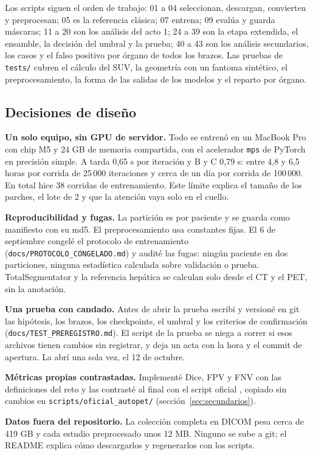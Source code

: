 Los scripts siguen el orden de trabajo: 01 a 04 seleccionan, descargan, convierten y preprocesan; 05 es la referencia clásica; 07 entrena; 09 evalúa y guarda máscaras; 11 a 20 son los análisis del acto 1; 24 a 39 son la etapa extendida, el ensamble, la decisión del umbral y la prueba; 40 a 43 son los análisis secundarios, los casos y el falso positivo por órgano de todos los brazos. Las pruebas de \texttt{tests/} cubren el cálculo del SUV, la geometría con un fantoma sintético, el preprocesamiento, la forma de las salidas de los modelos y el reparto por órgano.

\subsection{Decisiones de diseño}

\textbf{Un solo equipo, sin GPU de servidor.} Todo se entrenó en un MacBook Pro con chip M5 y 24 GB de memoria compartida, con el acelerador \texttt{mps} de PyTorch en precisión simple. A tarda 0,65 s por iteración y B y C 0,79 s: entre 4,8 y 6,5 horas por corrida de 25\,000 iteraciones y cerca de un día por corrida de 100\,000. En total hice 38 corridas de entrenamiento. Este límite explica el tamaño de los parches, el lote de 2 y que la atención vaya solo en el cuello.

\textbf{Reproducibilidad y fugas.} La partición es por paciente y se guarda como manifiesto con su md5. El preprocesamiento usa constantes fijas. El 6 de septiembre congelé el protocolo de entrenamiento (\texttt{docs/PROTOCOLO\_CONGELADO.md}) y audité las fugas: ningún paciente en dos particiones, ninguna estadística calculada sobre validación o prueba. TotalSegmentator y la referencia hepática se calculan solo desde el CT y el PET, sin la anotación.

\textbf{Una prueba con candado.} Antes de abrir la prueba escribí y versioné en git las hipótesis, los brazos, los checkpoints, el umbral y los criterios de confirmación (\texttt{docs/TEST\_PREREGISTRO.md}). El script de la prueba se niega a correr si esos archivos tienen cambios sin registrar, y deja un acta con la hora y el commit de apertura. La abrí una sola vez, el 12 de octubre.

\textbf{Métricas propias contrastadas.} Implementé Dice, FPV y FNV con las definiciones del reto y las contrasté al final con el script oficial \citep{labmidas}, copiado sin cambios en \texttt{scripts/oficial\_autopet/} (sección~\ref{sec:secundarios}).

\textbf{Datos fuera del repositorio.} La colección completa en DICOM pesa cerca de 419 GB y cada estudio preprocesado unos 12 MB. Ninguno se sube a git; el README explica cómo descargarlos y regenerarlos con los scripts.
